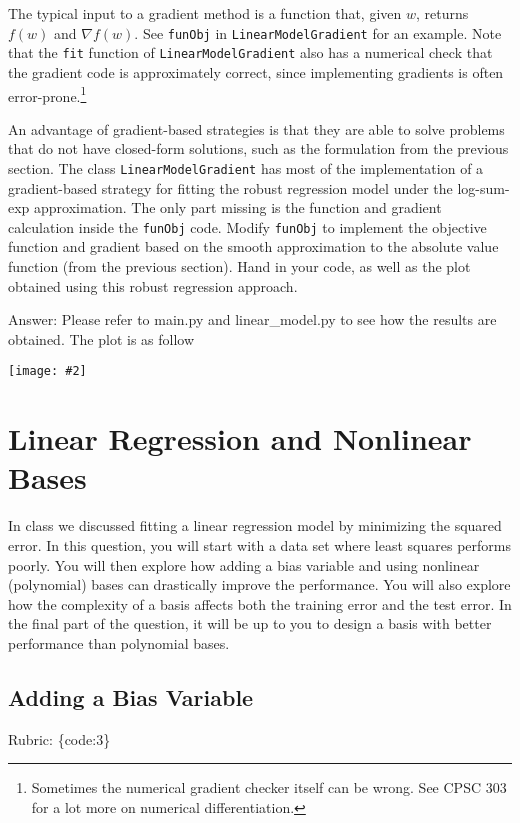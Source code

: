 \documentclass{article}
\def\rubric#1{\gre{Rubric: \{#1\}}}{}
\def\blu#1{{\color{blu}#1}}
\def\gre#1{{\color{gre}#1}}
\newcommand{\centerfig}[2]{\begin{center}\texttt{[image: \#2]}\end{center}}
\begin{document}
The typical input to a gradient method is a function that, given $w$, returns $f(w)$ and $\nabla f(w)$. See \texttt{funObj} in \texttt{LinearModelGradient} for an example. Note that the \texttt{fit} function of \texttt{LinearModelGradient} also has a numerical check that the gradient code is approximately correct, since implementing gradients is often error-prone.\footnote{Sometimes the numerical gradient checker itself can be wrong. See CPSC 303 for a lot more on numerical differentiation.}

An advantage of gradient-based strategies is that they are able to solve
problems that do not have closed-form solutions, such as the formulation from the
previous section. The class \texttt{LinearModelGradient} has most of the implementation
of a gradient-based strategy for fitting the robust regression model under the log-sum-exp approximation.
The only part missing is the function and gradient calculation inside the \texttt{funObj} code.
\blu{Modify \texttt{funObj} to implement the objective function and gradient based on the smooth
approximation to the absolute value function (from the previous section). Hand in your code, as well
as the plot obtained using this robust regression approach.}

\gre{Answer: Please refer to main.py and linear\_model.py to see how the results are obtained. The plot is as follow
}

\centerfig{.5}{../figs/least_squares_robust.pdf}


\section{Linear Regression and Nonlinear Bases}

In class we discussed fitting a linear regression model by minimizing the squared error.
In this question, you will start with a data set where least squares performs poorly.
You will then explore how adding a bias variable and using nonlinear (polynomial) bases can drastically improve the performance.
You will also explore how the complexity of a basis affects both the training error and the test error.
In the final part of the question, it will be up to you to design a basis with better performance than polynomial bases.

\subsection{Adding a Bias Variable}
\label{biasvar}
\rubric{code:3}
\end{document}
